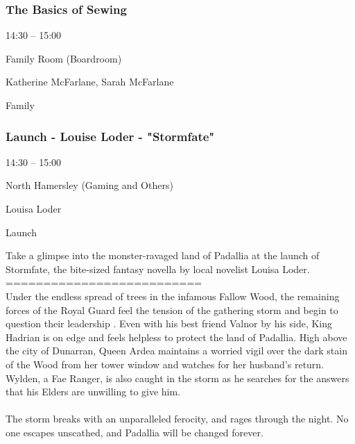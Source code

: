 \documentclass{scrreprt}
\begin{document}
\begin{multicols}{2}
\subsubsection*{The Basics of Sewing}\begin{description}
\setlength{\itemsep}{0pt}
\setlength{\parsep}{0pt}
\setlength{\parskip}{0pt}
\item[Time:]{14:30 -- 15:00}
\item[Venue:]{Family Room (Boardroom)}
\item[People:]{Katherine McFarlane, Sarah McFarlane}
\item[Tags:]{Family}\end{description}

\subsubsection*{Launch - Louise Loder - "Stormfate"}\begin{description}
\setlength{\itemsep}{0pt}
\setlength{\parsep}{0pt}
\setlength{\parskip}{0pt}
\item[Time:]{14:30 -- 15:00}
\item[Venue:]{North Hamersley (Gaming and Others)}
\item[People:]{Louisa Loder}
\item[Tags:]{Launch}\end{description}
Take a glimpse into the monster-ravaged land of Padallia at the launch of Stormfate, the bite-sized fantasy novella by local novelist Louisa Loder.\\==========================\\Under the endless spread of trees in the infamous Fallow Wood, the remaining forces of the Royal Guard feel the tension of the gathering storm and begin to question their leadership . Even with his best friend Valnor by his side, King Hadrian is on edge and feels helpless to protect the land of Padallia. High above the city of Dunarran, Queen Ardea maintains a worried vigil over the dark stain of the Wood from her tower window and watches for her husband's return. Wylden, a Fae Ranger, is also caught in the storm as he searches for the answers that his Elders are unwilling to give him.\\\\The storm breaks with an unparalleled ferocity, and rages through the night. No one escapes unscathed, and Padallia will be changed forever.

\end{multicols}
\end{document}
